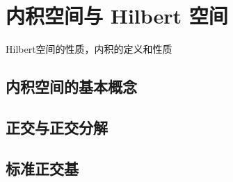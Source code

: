 \section{\deng 内积空间与 Hilbert 空间}

Hilbert空间的性质，内积的定义和性质

\subsection{\zhen 内积空间的基本概念}

\subsection{\zhen 正交与正交分解}

\subsection{\zhen 标准正交基}

